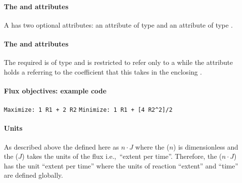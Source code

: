 \paragraph{The  and  attributes}
A \FluxObjective has two optional attributes:  an attribute of
type  and  an attribute of type .

\paragraph{The  and  attributes}
The required  is of type  and is restricted
to refer only to a \Reaction while the  attribute
holds a  referring to the coefficient that this \FluxObjective
takes in the enclosing \Objective.


\paragraph{Flux objectives: example code}
 \verb"Maximize: 1 R1 + 2 R2"
%
%
 \verb"Minimize: 1 R1 + [4 R2^2]/2"
%

\paragraph{Units}
As described above the \FluxObjective defined here as $n\cdot J$ where
the  ($n$) is dimensionless and the  ($J$)
takes the units of the  flux i.e.,~``extent per time''.
Therefore, the \FluxObjective ($n\cdot J$)  has the unit ``extent per time''
where the units of reaction ``extent'' and ``time'' are defined globally.



